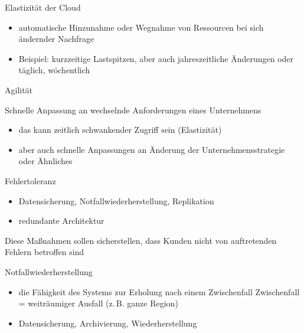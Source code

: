 \begin{flashcard}[Definition]{Elastizität der Cloud}
    \begin{itemize}
        \item automatische Hinzunahme oder Wegnahme von Ressourcen bei sich ändernder Nachfrage
        \item Beispiel: kurzzeitige Lastspitzen, aber auch jahreszeitliche Änderungen oder täglich, wöchentlich
    \end{itemize}

\end{flashcard}

\begin{flashcard}[Definition]{Agilität}

    \vspace{5mm}
    Schnelle Anpassung an wechselnde Anforderungen eines Unternehmens
    \begin{itemize}
        \item das kann zeitlich schwankender Zugriff sein (Elastizität)
        \item aber auch schnelle Anpassungen an Änderung der Unternehmensstrategie oder Ähnliches
    \end{itemize}

\end{flashcard}

\begin{flashcard}[Definition]{Fehlertoleranz}

    \begin{itemize}
        \item Datensicherung, Notfallwiederherstellung, Replikation
        \item redundante Architektur
    \end{itemize}
    Diese Maßnahmen sollen sicherstellen, dass Kunden nicht von auftretenden Fehlern betroffen sind
\end{flashcard}

\begin{flashcard}[Definition]{Notfallwiederherstellung}
    \begin{itemize}
        \item die Fähigkeit des Systems zur Erholung nach einem Zwischenfall\newline
        Zwischenfall = weiträumiger Ausfall (z.\,B. ganze Region)
        \item Datensicherung, Archivierung, Wiederherstellung
    \end{itemize}

\end{flashcard}

